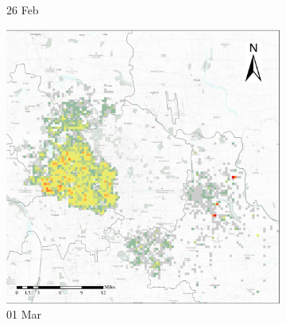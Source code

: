 \documentclass[preprints,ijgi,submit,moreauthors]{Definitions/mdpi}
\begin{document}
\begin{figure}[H]
\begin{subfigure}{.23\textwidth}
        \caption{26 Feb}
    \end{subfigure}
    \begin{subfigure}{.23\textwidth}
        \includegraphics[width=\textwidth]{Figures/Overall_spatial_patterns/FN5_D2020_03_01.eps}
        \caption{01 Mar}
    \end{subfigure}
    \begin{subfigure}{.2\textwidth}

\end{subfigure}
\end{figure}
\end{document}
